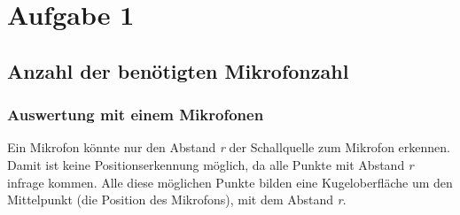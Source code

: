 
\newpage
\newpage
\newpage
\pagebreak
\vspace{30cm}
\section{Aufgabe 1}
\subsection{Anzahl der benötigten Mikrofonzahl}
\subsubsection{Auswertung mit einem Mikrofonen}
Ein Mikrofon könnte nur den Abstand \textit{r} der Schallquelle zum Mikrofon erkennen. Damit ist keine Positionserkennung möglich, da alle Punkte mit Abstand \textit{r} infrage kommen. 
Alle diese möglichen Punkte bilden eine Kugeloberfläche um den Mittelpunkt (die Position des Mikrofons), mit dem Abstand \textit{r}.

